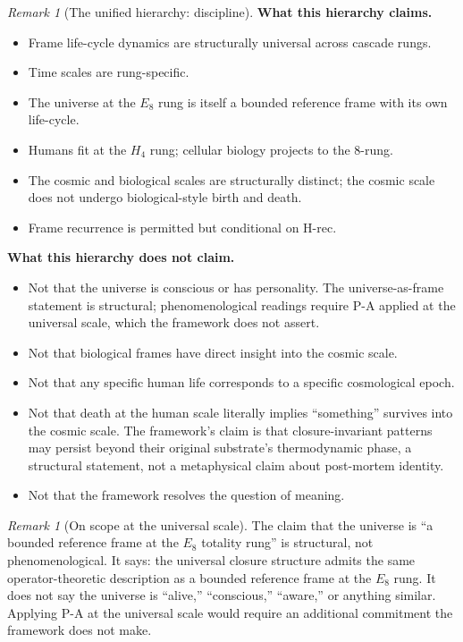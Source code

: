 \documentclass[11pt]{article}
\theoremstyle{plain}
\theoremstyle{definition}
\theoremstyle{remark}
\newtheorem{remark}[theorem]{Remark}
\begin{document}
\begin{remark}[The unified hierarchy: discipline]\label{rem:hierarchy-discipline}
\textbf{What this hierarchy claims.}
\begin{itemize}[leftmargin=2em]
\item Frame life-cycle dynamics are structurally universal across cascade rungs.
\item Time scales are rung-specific.
\item The universe at the $E_8$ rung is itself a bounded reference frame with its own life-cycle.
\item Humans fit at the $H_4$ rung; cellular biology projects to the 8-rung.
\item The cosmic and biological scales are structurally distinct; the cosmic scale does not undergo biological-style birth and death.
\item Frame recurrence is permitted but conditional on H-rec.
\end{itemize}

\textbf{What this hierarchy does not claim.}
\begin{itemize}[leftmargin=2em]
\item Not that the universe is conscious or has personality. The universe-as-frame statement is structural; phenomenological readings require P-A applied at the universal scale, which the framework does not assert.
\item Not that biological frames have direct insight into the cosmic scale.
\item Not that any specific human life corresponds to a specific cosmological epoch.
\item Not that death at the human scale literally implies ``something'' survives into the cosmic scale. The framework's claim is that closure-invariant patterns may persist beyond their original substrate's thermodynamic phase, a structural statement, not a metaphysical claim about post-mortem identity.
\item Not that the framework resolves the question of meaning.
\end{itemize}
\end{remark}

\begin{remark}[On scope at the universal scale]\label{rem:scope-universe}
The claim that the universe is ``a bounded reference frame at the $E_8$ totality rung'' is structural, not phenomenological. It says: the universal closure structure admits the same operator-theoretic description as a bounded reference frame at the $E_8$ rung. It does not say the universe is ``alive,'' ``conscious,'' ``aware,'' or anything similar. Applying P-A at the universal scale would require an additional commitment the framework does not make.
\end{remark}
\end{document}
